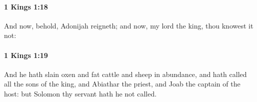 		\paragraph{1 Kings 1:18} %
			\label{1KINGS-1-18}

			And now, behold, Adonijah reigneth; and now, my lord the king, thou knowest it not:


		\paragraph{1 Kings 1:19} %
			\label{1KINGS-1-19}

			And he hath slain oxen and fat cattle and sheep in abundance, and hath called all the sons of the king, and Abiathar the priest, and Joab the captain of the host: but Solomon thy servant hath he not called.


